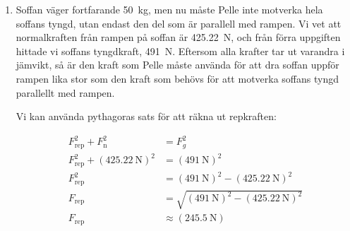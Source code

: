 \documentclass[11pt]{article}
\begin{document}
\begin{enumerate}[itemsep=2em]
              \textbf{Svar:} Pelle måste dra i repet med en kraft på \SI{491}{\newton} för att lyfta soffan i konstant hastighet.

        \item
              Soffan väger fortfarande \SI{50}{\kilo\gram}, men nu måste Pelle inte motverka hela soffans tyngd, utan endast den del som är parallell med rampen.
              Vi vet att normalkraften från rampen på soffan är \SI{425.22}{\newton}, och från förra uppgiften hittade vi soffans tyngdkraft, \SI{491}{\newton}. Eftersom alla krafter tar ut varandra i jämvikt, så är den kraft som Pelle måste använda för att dra soffan uppför rampen lika stor som den kraft som behövs för att motverka soffans tyngd parallellt med rampen.

              \begin{minipage}[c]{0.7\textwidth}
                      \raggedright
                      Vi kan använda pythagoras sats för att räkna ut repkraften:
              \end{minipage}
              \hfill
              \begin{minipage}[c]{0.15\textwidth}
                      
              \end{minipage}

              \begin{minipage}[c]{0.2\textwidth}
                      \begin{align*}
                              F_{\text{rep}}^2 + F_{\text{n}}^2           & = F_g^2                                                   \\
                              F_{\text{rep}}^2 + (\SI{425.22}{\newton})^2 & = (\SI{491}{\newton})^2                                   \\
                              F_{\text{rep}}^2                            & = (\SI{491}{\newton})^2 - (\SI{425.22}{\newton})^2        \\
                              F_{\text{rep}}                              & = \sqrt{(\SI{491}{\newton})^2 - (\SI{425.22}{\newton})^2} \\
                              F_{\text{rep}}                              & \approx (\SI{245.5}{\newton})
                      \end{align*}
              \end{minipage}
              \hspace{1em}
              \begin{minipage}[c]{0.3\textwidth}
                      
              \end{minipage}


\end{enumerate}
\end{document}
